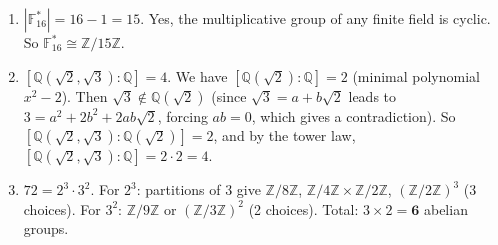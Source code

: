 \documentclass[11pt]{article}
\begin{document}
\begin{enumerate}
\item $|\mathbb{F}_{16}^*|=16-1=15$. Yes, the multiplicative group of any finite field is cyclic. So $\mathbb{F}_{16}^*\cong\mathbb{Z}/15\mathbb{Z}$.

\item $[\mathbb{Q}(\sqrt{2},\sqrt{3}):\mathbb{Q}]=4$. We have $[\mathbb{Q}(\sqrt{2}):\mathbb{Q}]=2$ (minimal polynomial $x^2-2$). Then $\sqrt{3}\notin\mathbb{Q}(\sqrt{2})$ (since $\sqrt{3}=a+b\sqrt{2}$ leads to $3=a^2+2b^2+2ab\sqrt{2}$, forcing $ab=0$, which gives a contradiction). So $[\mathbb{Q}(\sqrt{2},\sqrt{3}):\mathbb{Q}(\sqrt{2})]=2$, and by the tower law, $[\mathbb{Q}(\sqrt{2},\sqrt{3}):\mathbb{Q}]=2\cdot 2=4$.

\item $72=2^3\cdot 3^2$. For $2^3$: partitions of 3 give $\mathbb{Z}/8\mathbb{Z}$, $\mathbb{Z}/4\mathbb{Z}\times\mathbb{Z}/2\mathbb{Z}$, $(\mathbb{Z}/2\mathbb{Z})^3$ (3 choices). For $3^2$: $\mathbb{Z}/9\mathbb{Z}$ or $(\mathbb{Z}/3\mathbb{Z})^2$ (2 choices). Total: $3\times 2 = \mathbf{6}$ abelian groups.

\end{enumerate}
\end{document}

